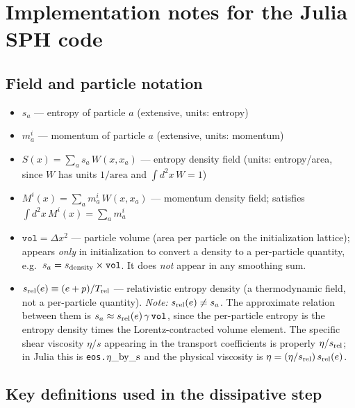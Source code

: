 \documentclass[12pt,aps,preprint,nofootinbib,noshowkeys,noshowpacs,longbibliography,superscriptaddress,tightenlines]{revtex4-2}
\begin{document}
\appendix

\section{Implementation notes for the Julia SPH code}
\label{app:impl}

\subsection*{Field and particle notation}

\begin{itemize}
  \item $s_a$ — entropy of particle $a$ (extensive, units: entropy)
  \item $m_a^i$ — momentum of particle $a$ (extensive, units: momentum)
  \item $S(x) = \sum_a s_a\,W(x,x_a)$ — entropy density field (units: entropy/area,
        since $W$ has units $1/\text{area}$ and $\int d^2x\,W = 1$)
  \item $M^i(x) = \sum_a m_a^i\,W(x,x_a)$ — momentum density field; satisfies
        $\int d^2x\,M^i(x) = \sum_a m_a^i$
  \item $\texttt{vol} = \Delta x^2$ — particle volume (area per particle on the
        initialization lattice); appears \emph{only} in initialization to convert
        a density to a per-particle quantity, e.g.\ $s_a = s_{\rm density}\times\texttt{vol}$.
        It does \emph{not} appear in any smoothing sum.
  \item $s_{\rm rel}(e) \equiv (e+p)/T_{\rm rel}$ — relativistic entropy density
        (a thermodynamic field, not a per-particle quantity).
        \emph{Note:} $s_{\rm rel}(e) \neq s_a$.  The approximate relation between
        them is $s_a \approx s_{\rm rel}(e)\,\gamma\,\texttt{vol}$,
        since the per-particle entropy is the entropy density times the
        Lorentz-contracted volume element.
        The specific shear viscosity $\eta/s$ appearing in the transport
        coefficients is properly $\eta/s_{\rm rel}$; in Julia this is
        \texttt{eos.\(\eta\_{\rm by\_s}\)} and the physical viscosity is
        $\eta = (\eta/s_{\rm rel})\,s_{\rm rel}(e)$.
\end{itemize}

\subsection*{Key definitions used in the dissipative step}
\end{document}
